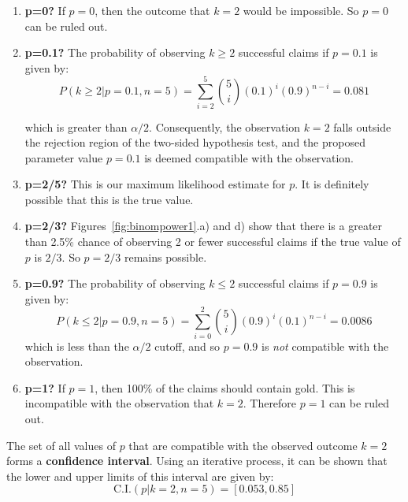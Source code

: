 \begin{enumerate}
\item{\bf p=0?} If $p=0$, then the outcome that $k=2$ would be
  impossible.  So $p=0$ can be ruled out.
\item{\bf p=0.1?} The probability of observing ${k}\geq{2}$ successful
  claims if $p=0.1$ is given by:
  \[
  P({k}\geq{2}|p=0.1,n=5) =
  \sum\limits_{i=2}^{5}\binom{5}{i}(0.1)^i(0.9)^{n-i} = 0.081
  \]
  
  which is greater than $\alpha/2$. Consequently, the observation
  $k=2$ falls outside the rejection region of the two-sided hypothesis
  test, and the proposed parameter value $p=0.1$ is deemed compatible
  with the observation.
\item{\bf p=2/5?} This is our maximum likelihood estimate for $p$.  It
  is definitely possible that this is the true value.
\item{\bf p=2/3?} Figures~\ref{fig:binompower1}.a) and d) show that
  there is a greater than 2.5\% chance of observing 2 or fewer
  successful claims if the true value of $p$ is $2/3$. So $p=2/3$
  remains possible.
\item{\bf p=0.9?} The probability of observing ${k}\leq{2}$ successful
  claims if $p=0.9$ is given by:
  \[
  P({k}\leq{2}|p=0.9,n=5) =
  \sum\limits_{i=0}^{2}\binom{5}{i}(0.9)^i(0.1)^{n-i} = 0.0086
  \]
  which is less than the $\alpha/2$ cutoff, and so $p=0.9$ is
  \emph{not} compatible with the observation.
\item{\bf p=1?} If $p=1$, then 100\% of the claims should contain
  gold. This is incompatible with the observation that $k=2$.
  Therefore $p=1$ can be ruled out.
\end{enumerate}

The set of all values of $p$ that are compatible with the observed
outcome $k=2$ forms a \textbf{confidence interval}. Using an iterative
process, it can be shown that the lower and upper limits of this
interval are given by:
\[
\mbox{C.I.}(p|k=2,n=5) = [0.053, 0.85]
\]


